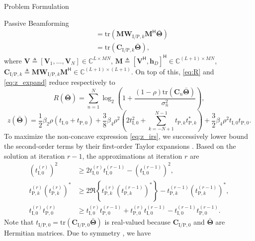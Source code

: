 \begin{section}{Problem Formulation}
\begin{subsection}{Passive Beamforming}
\begin{align}
			& = \mathrm{tr}(\mathbf{M}\mathbf{W}_{\mathrm{I/P},k}\mathbf{M}^\mathsf{H}\bar{\mathbf{\Theta}})\nonumber\\
			& = \mathrm{tr}(\mathbf{C}_{\mathrm{I/P},k}\bar{\mathbf{\Theta}})\label{eq:t_k},
		\end{align}
		where $\mathbf{V} \triangleq [\mathbf{V}_1,\dots,\mathbf{V}_N] \in \mathbb{C}^{L \times MN}$, $\mathbf{M} \triangleq [\mathbf{V}^\mathsf{H}, \mathbf{h}_{D}]^\mathsf{H} \in \mathbb{C}^{(L+1) \times MN}$, $\mathbf{C}_{\mathrm{I/P},k} \triangleq \mathbf{M}\mathbf{W}_{\mathrm{I/P},k}\mathbf{M}^\mathsf{H} \in \mathbb{C}^{(L+1)\times(L+1)}$. On top of this, \eqref{eq:R} and \eqref{eq:z_expand} reduce respectively to
		\begin{equation}
			R(\bar{\mathbf{\Theta}}) = \sum_{n=1}^{N}{\log_2\left(1+\frac{(1-\rho)\mathrm{tr}(\mathbf{C}_n\bar{\mathbf{\Theta}})}{\sigma_n^2}\right)},\label{eq:R_irs}
		\end{equation}
		\begin{equation}
			z(\bar{\mathbf{\Theta}}) = \frac{1}{2}{\beta_2}{\rho}(t_{\mathrm{I},0}+t_{\mathrm{P},0}) + \frac{3}{8}{\beta_4}{\rho^2} \left(2t_{\mathrm{I},0}^2 + \sum_{k=-N+1}^{N-1}{t_{\mathrm{P},k}t_{\mathrm{P},k}^*}\right) + \frac{3}{2}{\beta_4}{\rho^2}t_{\mathrm{I},0}t_{\mathrm{P},0}.\label{eq:z_irs}
		\end{equation}
		To maximize the non-concave expression \eqref{eq:z_irs}, we successively lower bound the second-order terms by their first-order Taylor expansions \cite{Adali2010}. Based on the solution at iteration $r{-}1$, the approximations at iteration $r$ are
		\begin{align}
			(t_{\mathrm{I},0}^{(r)})^2
			& \ge 2 t_{\mathrm{I},0}^{(r)}t_{\mathrm{I},0}^{(r-1)} - (t_{\mathrm{I},0}^{(r-1)})^2,\label{eq:taylor_1}\\
			t_{\mathrm{P},k}^{(r)} (t_{\mathrm{P},k}^{(r)})^*
			& \ge 2 \Re\left\{t_{\mathrm{P},k}^{(r)} (t_{\mathrm{P},k}^{(r-1)})^*\right\} - t_{\mathrm{P},k}^{(r-1)} (t_{\mathrm{P},k}^{(r-1)})^*,\label{eq:taylor_2}\\
			t_{\mathrm{I},0}^{(r)} t_{\mathrm{P},0}^{(r)}
			& \ge t_{\mathrm{I},0}^{(r)} t_{\mathrm{P},0}^{(r-1)} + t_{\mathrm{P},0}^{(r)} t_{\mathrm{I},0}^{(r-1)} - t_{\mathrm{I},0}^{(r-1)} t_{\mathrm{P},0}^{(r-1)}.\label{eq:taylor_3}
		\end{align}
		Note that $t_{\mathrm{I/P},0}=\mathrm{tr}(\mathbf{C}_{\mathrm{I/P},0}\bar{\mathbf{\Theta}})$ is real-valued because $\mathbf{C}_{\mathrm{I/P},0}$ and $\bar{\mathbf{\Theta}}$ are Hermitian matrices. Due to symmetry \cite{Golub2013}, we have

\end{subsection}
\end{section}
